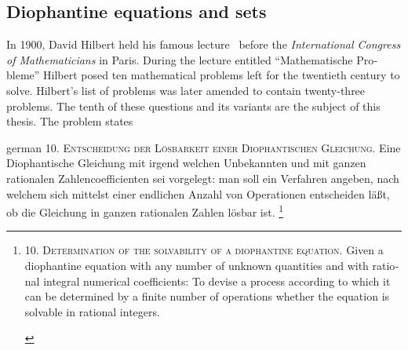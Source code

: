 %

\subsection{Diophantine equations and sets}

In 1900, David Hilbert held his famous lecture~\cite{Hilbert1900} before the
\emph{International Congress of Mathematicians} in Paris. During the lecture
entitled \foreignquote{german}{Mathematische Probleme} Hilbert posed ten
mathematical problems left for the twentieth century to solve.  Hilbert's list
of problems was later amended to contain twenty-three problems. The tenth of
these questions and its variants are the subject of this thesis. The problem
states

\begin{foreigndisplayquote}{german}
  \textsc{10. Entscheidung der Lösbarkeit einer Diophantischen Gleichung.}
  Eine Diophantische Gleichung mit irgend welchen Unbekannten und mit
  ganzen rationalen Zahlencoefficienten sei vorgelegt: man soll ein Verfahren
  angeben, nach welchem sich mittelst einer endlichen Anzahl von Operationen
  entscheiden läßt, ob die Gleichung in ganzen rationalen Zahlen lösbar ist.%
  \footnote{
    \begin{english}
      \textsc{10. Determination of the solvability of a diophantine equation.}
      Given a diophantine equation with any number of unknown quantities and
      with rational integral numerical coefficients: To devise a process
      according to which it can be determined by a finite number of operations
      whether the equation is solvable in rational integers.
      \hspace*{\fill}\cite[translation published in][]{Hilbert2000}
    \end{english}
  }
  \hspace*{\fill}\cite{Hilbert1900}
\end{foreigndisplayquote}

